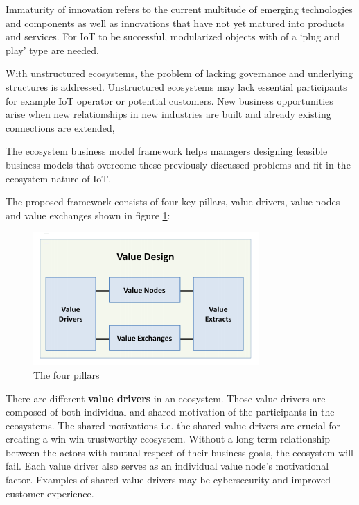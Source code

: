 		Immaturity of innovation refers to the current multitude of emerging technologies and components as well as innovations that have not yet matured into products and services. For IoT to be successful, modularized objects with of a `plug and play' type are needed.

		With unstructured ecosystems, the problem of lacking governance and underlying structures is addressed. Unstructured ecosystems may lack essential participants for example IoT operator or potential customers. New business opportunities arise when new relationships in new industries are built and already existing connections are extended,

		The ecosystem business model framework helps managers designing feasible business models that overcome these previously discussed problems and fit in the ecosystem nature of IoT. 

		The proposed framework consists of four key pillars, value drivers, value nodes and value exchanges shown in figure \ref{Westerlund pillars}:

			\begin{figure}[ht]
			    \begin{center}
			    \includegraphics[scale=1.0]{Talk11/westerlundpillars.png}
			    \end{center}
			    \caption{The four pillars}
			    \label{Westerlund pillars}
			\end{figure}

		There are different \textbf{value drivers} in an ecosystem. Those value drivers are composed of both individual and shared motivation of the participants in the ecosystems. The shared motivations i.e. the shared value drivers are crucial for creating a win-win trustworthy ecosystem. Without a long term relationship between the actors with mutual respect of their business goals, the ecosystem will fail. Each value driver also serves as an individual value node's motivational factor. Examples of shared value drivers may be cybersecurity and improved customer experience.

